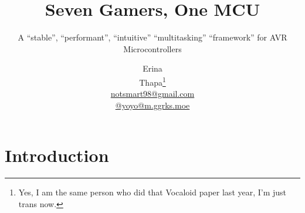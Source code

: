 \documentclass[letterpaper, egregdoesnotlikesansseriftitles]{scrartcl}
\begin{document}
\title{Seven Gamers, One MCU}
\subtitle{A ``stable'', ``performant'', ``intuitive'' ``multitasking'' ``framework'' for AVR Microcontrollers}
\author{\begin{tcolorbox}Erina\end{tcolorbox} Thapa\footnote{Yes, I am the same person who did that Vocaloid paper last year, I'm just trans now.} \\ \href{mailto:notsmart98@gmail.com}{notsmart98@gmail.com} \\ \href{https://m.ggrks.moe/@yoyo}{@yoyo@m.ggrks.moe}}

\maketitle

\begin{abstract}
    \lipsum[1]
\end{abstract}

\section{Introduction}
    \lipsum{}
\end{document}

